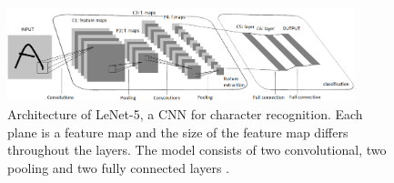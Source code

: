 \begin{figure} [H]
\centering
\includegraphics[width=0.9\textwidth]{figures/LeNet5}
\caption{Architecture of LeNet-5, a CNN for character recognition. Each plane is a feature map and the size of the feature map differs throughout the layers. The model consists of two convolutional, two pooling and two fully connected layers \citep{LeCun1998}.}
\label{fig:LeNet5}  
\end{figure}

 
